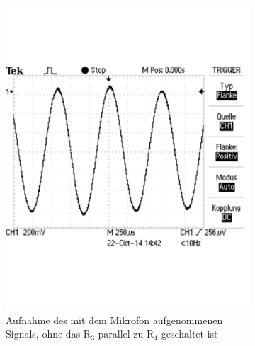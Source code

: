 \documentclass[12pt,a4paper]{article}
\begin{document}
\begin{figure}[H]
        \centering
        \begin{subfigure}[b]{0.48\textwidth}
                \includegraphics[width=\textwidth , scale = 0.4]{2_3_r3np_sig.pdf}
				\caption[Aufnahme des mit dem Mikrofon aufgenommenen Signals, ohne das R$_3$ parallel zu R$_4$ geschaltet ist]{Aufnahme des mit dem Mikrofon aufgenommenen Signals, ohne das R$_3$ parallel zu R$_4$ geschaltet ist}
  				\label{fig:2_3_r3np_sig}
        \end{subfigure}%
        ~ %
        \hfill
        \begin{subfigure}[b]{0.48\textwidth}

\end{subfigure}
\end{figure}
\end{document}
